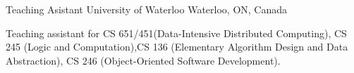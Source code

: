 

\begin{cventries}

   \cventry
    {Teaching Asistant} %
    {University of Waterloo} %
    {Waterloo, ON, Canada} %
    {} %
    {
      \begin{cvitems} %
      \item {Teaching assistant for CS 651/451(Data-Intensive Distributed Computing), CS 245 (Logic and Computation),CS 136 (Elementary Algorithm Design and Data Abstraction), CS 246 (Object-Oriented Software Development).}
      \end{cvitems}
    }
\end{cventries}
